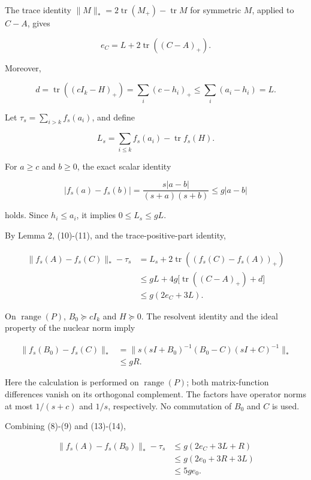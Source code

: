 \documentclass[10pt,a4paper]{article}
\begin{document}
The trace identity
\(\|M\|_*=2\operatorname{tr}(M_+)-\operatorname{tr}M\) for symmetric
\(M\), applied to \(C-A\), gives

\[
e_C=L+2\operatorname{tr}((C-A)_+).\tag{10}
\]

Moreover,

\[
d=\operatorname{tr}((cI_k-H)_+)
 =\sum_i(c-h_i)_+\le\sum_i(a_i-h_i)=L.\tag{11}
\]

Let \(\tau_s=\sum_{i>k}f_s(a_i)\), and define

\[
L_s=\sum_{i\le k}f_s(a_i)-\operatorname{tr}f_s(H).
\]


For \(a\ge c\) and \(b\ge0\), the exact scalar identity

\[
|f_s(a)-f_s(b)|
=\frac{s|a-b|}{(s+a)(s+b)}\le g|a-b|\tag{12}
\]

holds. Since \(h_i\le a_i\), it implies \(0\le L_s\le gL\).

By Lemma 2, (10)-(11), and the trace-positive-part identity,

\[
\begin{aligned}
\|f_s(A)-f_s(C)\|_*-\tau_s
&=L_s+2\operatorname{tr}((f_s(C)-f_s(A))_+)\\
&\le gL+4g\bigl[\operatorname{tr}((C-A)_+)+d\bigr]\\
&\le g(2e_C+3L).
\end{aligned}\tag{13}
\]

On \(\operatorname{range}(P)\), \(B_0\succeq cI_k\) and \(H\succeq0\).
The resolvent identity and the ideal property of the nuclear norm imply

\[
\begin{aligned}
\|f_s(B_0)-f_s(C)\|_*
&=\bigl\|s(sI+B_0)^{-1}(B_0-C)(sI+C)^{-1}\bigr\|_*\\
&\le gR.
\end{aligned}\tag{14}
\]

Here the calculation is performed on \(\operatorname{range}(P)\); both
matrix-function differences vanish on its orthogonal complement. The
factors have operator norms at most \(1/(s+c)\) and \(1/s\),
respectively. No commutation of \(B_0\) and \(C\) is used.

Combining (8)-(9) and (13)-(14),

\[
\begin{aligned}
\|f_s(A)-f_s(B_0)\|_*-\tau_s
&\le g(2e_C+3L+R)\\
&\le g(2e_0+3R+3L)\\
&\le5g e_0.
\end{aligned}\tag{15}
\]
\end{document}
